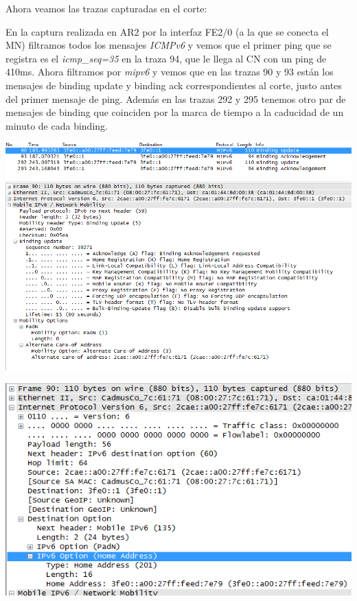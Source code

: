 \documentclass{article}
\begin{document}
Ahora veamos las trazas capturadas en el corte:

En la captura realizada en AR2 por la interfaz FE2/0 (a la que se conecta el MN) filtramos todos los mensajes \textit{ICMPv6} y vemos que el primer ping que se registra es el \textit{icmp\_seq=35} en la traza 94, que le llega al CN con un ping de 410ms. Ahora filtramos por \textit{mipv6} y vemos que en las trazas 90 y 93 están los mensajes de binding update y binding ack correspondientes al corte, justo antes del primer mensaje de ping. Además en las trazas 292 y 295 tenemos otro par de mensajes de binding que coinciden por la marca de tiempo a la caducidad de un minuto de cada binding.



\begin{center}
	\includegraphics[scale=0.7]{images/bindUpdate.PNG}
\end{center}

\begin{center}
	\includegraphics[scale=0.7]{images/bindDestOpt.PNG}
\end{center}
\end{document}
